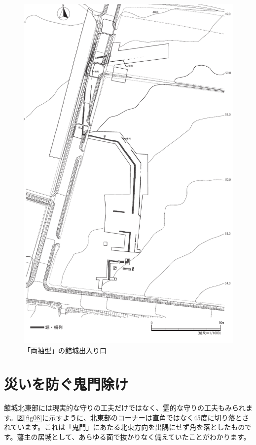 \documentclass[11pt,report]{jsbook}
\begin{document}
\begin{figure}[h]
\centering
\includegraphics[height=230truemm]{fig/07.pdf}
\caption{「両袖型」の館城出入り口}
\label{fig07}
\end{figure}

\section{災いを防ぐ鬼門除け}
館城北東部には現実的な守りの工夫だけではなく、霊的な守りの工夫もみられます。図\ref{fig08}に示すように、北東部のコーナーは直角ではなく45度に切り落とされています。これは「鬼門」にあたる北東方向を出隅にせず角を落としたものです。藩主の居城として、あらゆる面で抜かりなく備えていたことがわかります。
\end{document}
